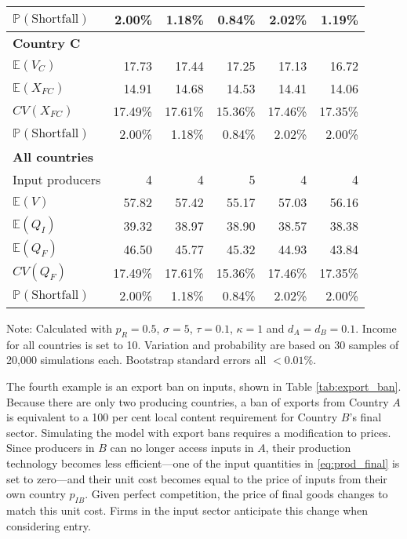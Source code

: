 \documentclass{article}
\begin{document}
\begin{table}
\begin{threeparttable}
\begin{tabular}{lrrrrr}
            $\mathbb{P}(\text{Shortfall})$ & 2.00\% & 1.18\% & 0.84\% & 2.02\% & 1.19\% \\ 
            \midrule
            \textbf{Country C} \\
            $\mathbb{E}(V_C)$ & 17.73 & 17.44 & 17.25 & 17.13 & 16.72 \\
            $\mathbb{E}(X_{FC})$ & 14.91 & 14.68 & 14.53 & 14.41 & 14.06 \\
            $CV(X_{FC})$ & 17.49\% & 17.61\% & 15.36\% & 17.46\% & 17.35\% \\
            $\mathbb{P}(\text{Shortfall})$ & 2.00\% & 1.18\% & 0.84\% & 2.02\% & 2.00\% \\ 
            \midrule
            \textbf{All countries} \\
            Input producers & 4 & 4 & 5 & 4 & 4 \\
            $\mathbb{E}(V)$ & 57.82 & 57.42 & 55.17 & 57.03 & 56.16 \\
            $\mathbb{E}(Q_I)$ & 39.32 & 38.97 & 38.90 & 38.57 & 38.38 \\
            $\mathbb{E}(Q_F)$ & 46.50 & 45.77 & 45.32 & 44.93 & 43.84 \\
            $CV(Q_F)$ & 17.49\% & 17.61\% & 15.36\% & 17.46\% & 17.35\% \\
            $\mathbb{P}(\text{Shortfall})$ & 2.00\% &1.18\% & 0.84\% & 2.02\% & 2.00\% \\ 
            \bottomrule
        \end{tabular}
        \begin{tablenotes}
            \small \item Note: Calculated with $p_R = 0.5$, $\sigma = 5$, $\tau = 0.1$, $\kappa = 1$ and $d_A = d_B = 0.1$. Income for all countries is set to 10. Variation and probability are based on 30 samples of 20,000 simulations each. Bootstrap standard errors all $<0.01\%$.
        \end{tablenotes}
    \end{threeparttable}
\end{table}

The fourth example is an export ban on inputs, shown in Table \ref{tab:export_ban}. Because there are only two producing countries, a ban of exports from Country $A$ is equivalent to a 100 per cent local content requirement for Country $B$'s final sector. Simulating the model with export bans requires a modification to prices. Since producers in $B$ can no longer access inputs in $A$, their production technology becomes less efficient---one of the input quantities in \ref{eq:prod_final} is set to zero---and their unit cost becomes equal to the price of inputs from their own country $p_{IB}$. Given perfect competition, the price of final goods changes to match this unit cost. Firms in the input sector anticipate this change when considering entry.
\end{document}
